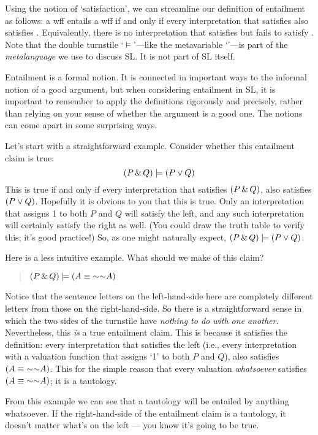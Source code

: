 {{Using the notion of `satisfaction', we can streamline our definition of entailment as follows: a wff \metaA{} entails a wff \metaB{} if and only if every interpretation that satisfies \metaA{} also satisfies \metaB{}. Equivalently, there is no interpretation that satisfies \metaA{} but fails to satisfy \metaB{}. Note that the double turnstile `$\models$'---like the metavariable `\metaA{}'---is part of the \emph{metalanguage} we use to discuss SL. It is not part of SL itself.

Entailment is a formal notion. It is connected in important ways to the informal notion of a good argument, but when considering entailment in SL, it is important to remember to apply the definitions rigorously and precisely, rather than relying on your sense of whether the argument is a good one. The notions can come apart in some surprising ways.

Let's start with a straightforward example. Consider whether this entailment claim is true: $$(P\,\&\, Q) \models (P\vee Q)$$ This is true if and only if every interpretation that satisfies $(P\,\&\, Q)$, also satisfies  $(P\vee Q)$. Hopefully it is obvious to you that this is true. Only an interpretation that assigns 1 to both $P$ and $Q$ will satisfy the left, and any such interpretation will certainly satisfy the right as well. (You could draw the truth table to verify this; it's good practice!) So, as one might naturally expect, $(P\,\&\, Q) \models (P\vee Q)$.

Here is a less intuitive example. What should we make of this claim?

\begin{quote}
$(P\eand Q) \models (A\eiff\enot\enot A)$
\end{quote}

Notice that the sentence letters on the left-hand-side here are completely different letters from those on the right-hand-side. So there is a straightforward sense in which the two sides of the turnstile have \emph{nothing to do with one another}. Nevertheless, this \emph{is} a true entailment claim. This is because it satisfies the definition: every interpretation that satisfies the left (i.e., every interpretation with a valuation function that assigns `1' to both $P$ and $Q$), also satisfies $(A\eiff\enot\enot A)$. This for the simple reason that every valuation \emph{whatsoever} satisfies $(A\eiff\enot\enot A)$; it is a tautology.

From this example we can see that a tautology will be entailed by anything whatsoever. If the right-hand-side of the entailment claim is a tautology, it doesn't matter what's on the left --- you know it's going to be true.

}}
